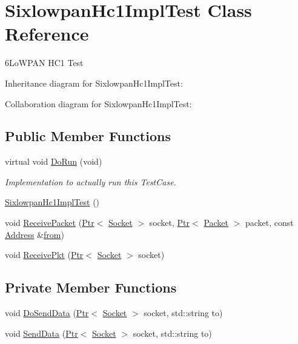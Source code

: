 \hypertarget{classSixlowpanHc1ImplTest}{}\section{Sixlowpan\+Hc1\+Impl\+Test Class Reference}
\label{classSixlowpanHc1ImplTest}


6\+Lo\+W\+P\+AN H\+C1 Test  




Inheritance diagram for Sixlowpan\+Hc1\+Impl\+Test\+:


Collaboration diagram for Sixlowpan\+Hc1\+Impl\+Test\+:
\subsection*{Public Member Functions}
\begin{DoxyCompactItemize}
\item 
virtual void \hyperlink{classSixlowpanHc1ImplTest_aa79a7268da3494e740b28d19c4ec734c}{Do\+Run} (void)
\begin{DoxyCompactList}\small\item\em Implementation to actually run this Test\+Case. \end{DoxyCompactList}\item 
\hyperlink{classSixlowpanHc1ImplTest_ab314ea12daacc58bf8270bf013f8f14d}{Sixlowpan\+Hc1\+Impl\+Test} ()
\item 
void \hyperlink{classSixlowpanHc1ImplTest_ae939421ac4cb1005598711d2f5f5d467}{Receive\+Packet} (\hyperlink{classns3_1_1Ptr}{Ptr}$<$ \hyperlink{classns3_1_1Socket}{Socket} $>$ socket, \hyperlink{classns3_1_1Ptr}{Ptr}$<$ \hyperlink{classns3_1_1Packet}{Packet} $>$ packet, const \hyperlink{classns3_1_1Address}{Address} \&\hyperlink{lte__amc_8m_a1b4c81ff74eb1a626b5ade44c81004b3}{from})
\item 
void \hyperlink{classSixlowpanHc1ImplTest_a8be144b5b29cfd9862a78547479a6b0d}{Receive\+Pkt} (\hyperlink{classns3_1_1Ptr}{Ptr}$<$ \hyperlink{classns3_1_1Socket}{Socket} $>$ socket)
\end{DoxyCompactItemize}
\subsection*{Private Member Functions}
\begin{DoxyCompactItemize}
\item 
void \hyperlink{classSixlowpanHc1ImplTest_adf652da71799c3e4c09e9d084c7317db}{Do\+Send\+Data} (\hyperlink{classns3_1_1Ptr}{Ptr}$<$ \hyperlink{classns3_1_1Socket}{Socket} $>$ socket, std\+::string to)
\item 
void \hyperlink{classSixlowpanHc1ImplTest_ab7fde43d2562fa00a12bd110d0760979}{Send\+Data} (\hyperlink{classns3_1_1Ptr}{Ptr}$<$ \hyperlink{classns3_1_1Socket}{Socket} $>$ socket, std\+::string to)
\end{DoxyCompactItemize}
